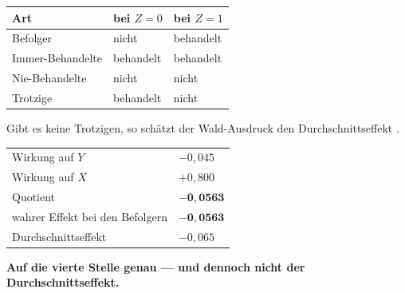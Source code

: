 \begin{merksatz}
\begin{center}
{\small
\renewcommand{\arraystretch}{1.5}
\begin{tabular}{@{}P{2.6cm}P{2.4cm}P{2.4cm}@{}}
\toprule
\textbf{Art} & \textbf{bei $Z=0$} & \textbf{bei $Z=1$}\\
\midrule
Befolger & nicht & behandelt\\
Immer-Behandelte & behandelt & behandelt\\
Nie-Behandelte & nicht & nicht\\
Trotzige & behandelt & nicht\\
\bottomrule
\end{tabular}}
\end{center}

Gibt es keine Trotzigen, so schätzt der Wald-Ausdruck den Durchschnittseffekt .

\begin{center}
\begin{minipage}{0.88\textwidth}
\end{minipage}
\end{center}

\begin{center}
{\small
\renewcommand{\arraystretch}{1.48}
\begin{tabular}{@{}P{3.2cm}P{2.6cm}@{}}
\toprule
Wirkung auf $Y$ & $-0{,}045$\\
Wirkung auf $X$ & $+0{,}800$\\
\midrule
Quotient & $\mathbf{-0{,}0563}$\\
\midrule
wahrer Effekt bei den Befolgern & $\mathbf{-0{,}0563}$\\
Durchschnittseffekt & $-0{,}065$\\
\bottomrule
\end{tabular}}
\end{center}

\begin{center}
\begin{minipage}{0.9\textwidth}
\textbf{Auf die vierte Stelle genau --- und dennoch nicht der Durchschnittseffekt.}
\end{minipage}
\end{center}


\end{merksatz}
